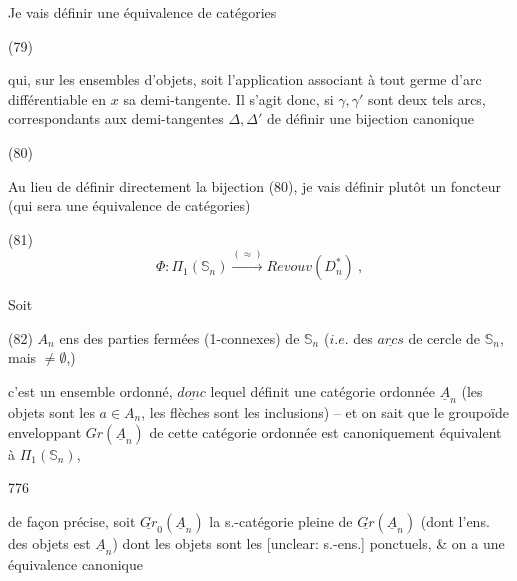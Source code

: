 Je vais définir une équivalence de
catégories

(79)

qui, sur les ensembles d'objets, soit
l'application associant à tout germe d'arc
différentiable en $x$ sa demi-tangente. Il
s'agit donc, si $\gamma, \gamma'$ sont deux tels
arcs, correspondants aux demi-tangentes $\Delta, \Delta'$
de définir une bijection canonique

\newpage


(80) 

Au lieu de définir directement la bijection
(80), je vais définir plutôt un
foncteur (qui sera une équivalence de
catégories)

(81) $$ \Phi : \Pi_1(\mathbb{S}_n) \xrightarrow{(\approx)} Revouv(D^*_n) \ , $$

Soit

(82) $A_n$ ens des parties fermées (1-connexes) de $\mathbb{S}_n$
($i.e.$ des $\underline{arcs}$ de cercle de $\mathbb{S}_n$,
mais $\neq \emptyset$,)

c'est un ensemble ordonné, $\underline{donc}$
lequel définit une catégorie ordonnée $\underline{A}_n$
(les objets sont les $a \in A_n$, les flèches
sont les inclusions) -- et on sait que
le groupoïde enveloppant $Gr(\underline{A}_n)$ de cette catégorie
ordonnée est canoniquement équivalent à $\Pi_1(\mathbb{S}_n)$,

\newpage


776

de façon précise, soit $\underline{Gr}_0(\underline{A}_n)$ la s.-catégorie pleine de $\underline{Gr}(\underline{A}_n)$ (dont l'ens. des objets est $\underline{A}_n$) dont les objets sont les [unclear: s.-ens.] ponctuels, & on a une équivalence canonique

